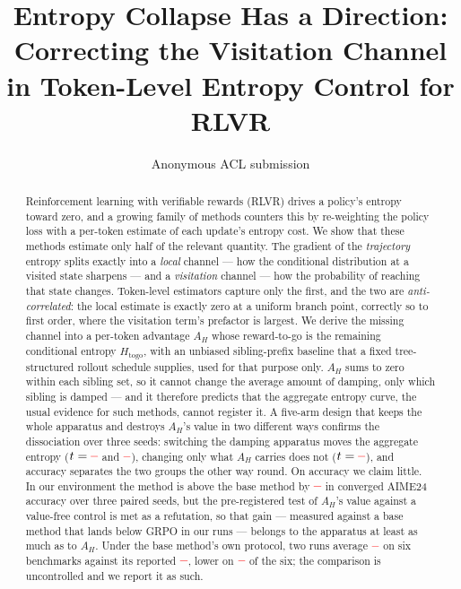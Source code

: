 \documentclass[11pt]{article}
\title{Entropy Collapse Has a Direction:\\
Correcting the Visitation Channel in Token-Level Entropy Control for RLVR}
\author{Anonymous ACL submission}
\newcommand{\Htogo}{H_{\mathrm{togo}}}
\newcommand{\AH}{A_{H}}
\providecommand{\PENDING}{\textcolor{red}{\textbf{--}}}
\newcommand{\num}[1]{\ifcsname #1\endcsname\csname #1\endcsname\else\PENDING\fi}
\begin{document}
\maketitle

\begin{abstract}
Reinforcement learning with verifiable rewards (RLVR) drives a policy's entropy
toward zero, and a growing family of methods counters this by re-weighting the
policy loss with a per-token estimate of each update's entropy cost. We show that
these methods estimate only half of the relevant quantity. The gradient of the
\emph{trajectory} entropy splits exactly into a \emph{local} channel --- how the
conditional distribution at a visited state sharpens --- and a \emph{visitation}
channel --- how the probability of reaching that state changes. Token-level
estimators capture only the first, and the two are \emph{anti-correlated}: the local
estimate is exactly zero at a uniform branch point, correctly so to first order,
where the visitation term's prefactor is largest. We derive the missing channel into
a per-token advantage $\AH$ whose reward-to-go is the remaining conditional entropy
$\Htogo$, with an unbiased sibling-prefix baseline that a fixed tree-structured
rollout schedule supplies, used for that purpose only. $\AH$ sums to zero within each sibling set, so it cannot change the average
amount of damping, only which sibling is damped --- and it therefore predicts that
the aggregate entropy curve, the usual evidence for such methods, cannot register
it. A five-arm design that keeps the whole apparatus and destroys $\AH$'s value in
two different ways confirms the dissociation over three seeds: switching the damping
apparatus moves the aggregate entropy ($t = \num{Tsteergrpoentropy}$ and
$\num{Tuniformsteerentropy}$), changing only what $\AH$ carries does not
($t = \num{Tsigneduniformentropy}$), and accuracy separates the two groups the other
way round. On accuracy we claim little. In our environment the method is above the
base method by $\num{Csignedsteeracc}$ in converged AIME24 accuracy over three paired
seeds, but the pre-registered test of $\AH$'s value against a value-free control is
met as a refutation, so that gain --- measured against a base method that lands
below GRPO in our runs --- belongs to the apparatus at least as much as to $\AH$. Under the base method's own protocol, two runs average
$\num{ProtobestMeanAvg}$ on six benchmarks against its reported
$\num{ProtorefSteerAvg}$, lower on $\num{ProtocmpSteerBelow}$ of the six; the
comparison is uncontrolled and we report it as such.
\end{abstract}
\end{document}
